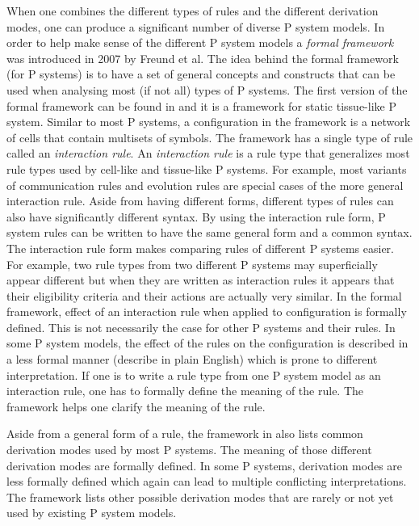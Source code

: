 \documentclass[12pt,A4]{article}
\begin{document}
When one combines the different types of rules and the different derivation modes, one can produce
a significant number of diverse P system models. In order to help make sense of the different P 
system models a \emph{formal framework} was introduced in 2007 by Freund et al. The idea behind the
formal framework (for P systems) is to have a set of general concepts and constructs that can be 
used when analysing most (if not all) types of P systems. The first version of the formal framework
can be found in \cite{freund-2007-ff-stat} and it is a framework for static tissue-like P system.
Similar to most P systems, a configuration in the framework is a network of cells that contain 
multisets of symbols. The framework has a single type of rule called an \emph{interaction rule}.
An \emph{interaction rule} is a rule type that generalizes most rule types used by cell-like and 
tissue-like P systems. For example, most variants of communication rules and evolution rules are
special cases of the more general interaction rule. Aside from having different forms, different 
types of rules can also have significantly different syntax. By using the interaction rule form,
P system rules can be written to have the same general form and a common syntax. The interaction 
rule form makes comparing rules of different P systems easier. For example, two rule types from
two different P systems may superficially appear different but when they are written as interaction
rules it appears that their eligibility criteria and their actions are actually very similar. In the
formal framework, effect of an interaction rule when applied to configuration is formally defined. 
This is not necessarily the case for other P systems and their rules. In some P system models,
the effect of the rules on the configuration is described in a less formal manner (describe in plain
English) which is prone to different interpretation. If one is to write a rule type from one P 
system model as an interaction rule, one has to formally define the meaning of the rule. The 
framework helps one clarify the meaning of the rule.

Aside from a general form of a rule, the framework in \cite{freund-2007-ff-stat} also lists common
derivation modes used by most P systems. The meaning of those different derivation modes are 
formally defined. In some P systems, derivation modes are less formally defined which again can lead 
to multiple conflicting interpretations. The framework lists other possible derivation modes that
are rarely or not yet used by existing P system models.
\end{document}

